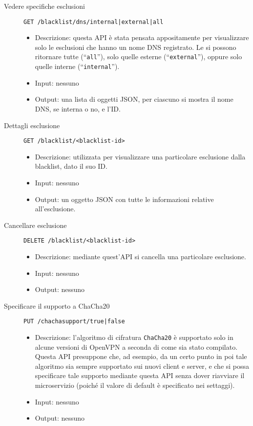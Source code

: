 \begin{description}
    \item[Vedere specifiche esclusioni]\texttt{GET /blacklist/dns/internal|external|all}
    \begin{itemize}
        \item Descrizione: questa API è stata pensata appositamente per visualizzare solo
        le esclusioni che hanno un nome DNS registrato. Le si possono ritornare
        tutte (``\texttt{all}''), solo quelle esterne (``\texttt{external}''),
        oppure solo quelle interne (``\texttt{internal}'').
        \item Input: nessuno
        \item Output: una lista di oggetti JSON, per ciascuno si mostra il nome DNS,
        se interna o no, e l'ID.
    \end{itemize}

    \item[Dettagli esclusione]\texttt{GET /blacklist/<blacklist-id>}
    \begin{itemize}
        \item Descrizione: utilizzata per visualizzare
        una particolare esclusione dalla blacklist, dato il suo ID.
        \item Input: nessuno
        \item Output: un oggetto JSON con tutte le informazioni relative all'esclusione.
    \end{itemize}

    \item[Cancellare esclusione]\texttt{DELETE /blacklist/<blacklist-id>}
    \begin{itemize}
        \item Descrizione: mediante quest'API si cancella una particolare esclusione. 
        \item Input: nessuno
        \item Output: nessuno
    \end{itemize}

    \item[Specificare il supporto a ChaCha20]\texttt{PUT /chachasupport/true|false}
    \begin{itemize}
        \item Descrizione: l'algoritmo di cifratura \texttt{ChaCha20} è
        supportato solo in alcune versioni di OpenVPN a seconda di come sia stato compilato.
        Questa API presuppone che, ad esempio, da un certo punto in poi tale algoritmo sia
        sempre supportato sui nuovi client e server, e che si possa specificare tale
        supporto mediante questa API senza dover riavviare il microservizio (poiché
        il valore di default è specificato nei settaggi).
        \item Input: nessuno
        \item Output: nessuno
    \end{itemize}


\end{description}
